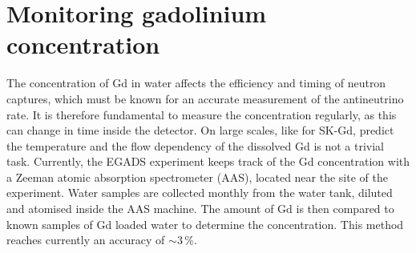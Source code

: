



\section{Monitoring gadolinium concentration}
\label{sec:gad}

The concentration of Gd in water affects the efficiency and timing of neutron captures, %
which must be known for an accurate measurement of the antineutrino rate.
It is therefore fundamental to measure the concentration regularly, as this can change in time inside the detector.
On large scales, like for SK-Gd, %
predict the temperature and the flow dependency of the dissolved Gd is not a trivial task.
Currently, the EGADS experiment keeps track of the Gd concentration with a Zeeman atomic absorption spectrometer (AAS), %
located near the site of the experiment.
Water samples are collected monthly from the water tank, diluted and atomised inside the AAS machine.
The amount of Gd is then compared to known samples of Gd loaded water to determine the concentration.
This method reaches currently an accuracy of $\sim$3\,\%.

